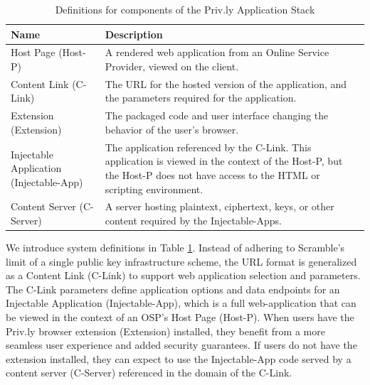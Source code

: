 \documentclass[letterpaper,twocolumn,10pt]{article}
\begin{document}
\begin{table}
    \begin{tabular}{|p{2.5cm}|p{4.5cm}|}
        \hline
        \textbf{Name}                  & \textbf{Description}                                                                                             \\ \hline
        Host Page \newline(Host-P)              & A rendered web application from an Online Service Provider, viewed on the client.                                             \\ \hline
        Content Link \newline(C-Link)           & The URL for the hosted version of the application, and the parameters required for the application.                      \\ \hline
        Extension \newline(Extension)              & The packaged code and user interface changing the behavior of the user's browser.                       \\ \hline
        Injectable Application \newline(Injectable-App) & The application referenced by the C-Link. This application is viewed in the context of the Host-P, but the Host-P does not have access to the HTML or scripting environment.                                                       \\ \hline
        Content Server \newline(C-Server)         & A server hosting plaintext, ciphertext, keys, or other content required by the Injectable-Apps.
    \end{tabular}
    \caption{Definitions for components of the Priv.ly Application Stack}
    \label{tab:definitions}
\end{table}

We introduce system definitions in Table \ref{tab:definitions}. Instead of 
adhering to Scramble's limit of a single public key infrastructure scheme, the 
URL format is generalized as a Content Link (C-Link) to support web application 
selection and parameters. The C-Link parameters define application options and 
data endpoints for an Injectable Application (Injectable-App), which is a full 
web-application that can be viewed in the context of an OSP's Host Page (Host-P). 
When users have the Priv.ly browser extension (Extension) installed, they benefit 
from a more seamless user experience and added security guarantees. If users 
do not have the extension installed, they can expect to use the Injectable-App 
code served by a content server (C-Server) referenced in the domain of the C-Link.
\end{document}
